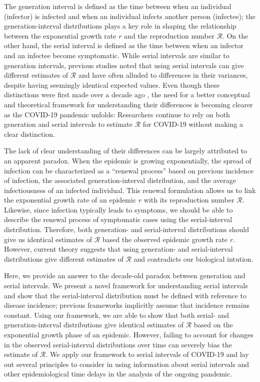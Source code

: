 \documentclass[12pt]{article}
\begin{document}
The generation interval is defined as the time between when an individual (infector) is infected and when an individual infects another person (infectee);
the generation-interval distributions plays a key role in shaping the relationship between the exponential growth rate $r$ and the reproduction number $\mathcal R$.
On the other hand, the serial interval is defined as the time between when an infector and an infectee become symptomatic.
While serial intervals are similar to generation intervals, previous studies noted that using serial intervals can give different estimates of $\mathcal R$ and have often alluded to differences in their variances, despite having seemingly identical expected values.
Even though these distinctions were first made over a decade ago \citep{svensson2007note}, 
the need for a better conceptual and theoretical framework for understanding their differences is becoming clearer as the COVID-19 pandemic unfolds:
Researchers continue to rely on both generation and serial intervals to estimate $\mathcal R$ for COVID-19 without making a clear distinction.

The lack of clear understanding of their differences can be largely attributed to an apparent paradox.
When the epidemic is growing exponentially, the spread of infection can be characterized as a ``renewal process'' based on previous incidence of infection, the associated generation-interval distribution, and the average infectiousness of an infected individual.
This renewal formulation allows us to link the exponential growth rate of an epidemic $r$ with its reproduction number $\mathcal R$.
Likewise, since infection typically leads to symptoms, we should be able to describe the renewal process of symptomatic cases using the serial-interval distribution.
Therefore, both generation- and serial-interval distributions should give us identical estimates of  $\mathcal R$ based the observed epidemic growth rate $r$.
However, current theory suggests that using generation- and serial-interval distributions give different estimates of $\mathcal R$ and contradicts our biological intution.

Here, we provide an answer to the decade-old paradox between generation and serial intervals.
We present a novel framework for understanding serial intervals and show that the serial-interval distribution must be defined with reference to disease incidence;
previous frameworks implicitly assume that incidence remains constant.
Using our framework, we are able to show that both serial- and generation-interval distributions give identical estimates of $\mathcal R$ based on the exponential growth phase of an epidemic.
However, failing to account for changes in the observed serial-interval distributions over time can severely bias the estimate of $\mathcal R$.
We apply our framework to serial intervals of COVID-19 and lay out several principles to consider in using information about serial intervals and other epidemiological time delays in the analysis of the ongoing pandemic.
\end{document}
